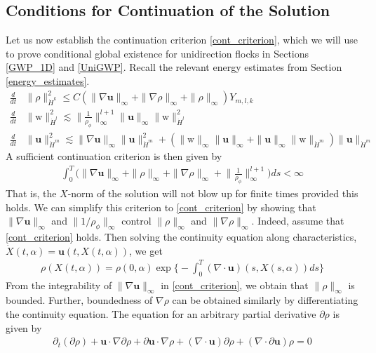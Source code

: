 \documentclass[11pt,letterpaper]{amsart}
\theoremstyle{plain}
\theoremstyle{definition}
\theoremstyle{remark}
\renewcommand{\leq}{\leqslant}
\def\Hmdot{\dot{H}^m}
\def\Hldot{\dot{H}^l}
\def\Hkdot{\dot{H}^k}
\def\u{\textbf{u}}
\def \wt {\mathrm{w}}
\begin{document}
\subsection{Conditions for Continuation of the Solution}
\label{sec_cont_criterion}
Let us now establish the continuation criterion \eqref{cont_criterion}, which we will use to prove
conditional global existence for unidirection flocks in Sections \ref{GWP_1D} and \ref{UniGWP}.  Recall 
the relevant energy estimates from Section \ref{energy_estimates}. 
\begin{align}
    \frac{d}{dt} &\|\rho\|_{\Hkdot}^2 \leq C (\|\nabla \u\|_{\infty} + \|\nabla \rho\|_{\infty} + \|\rho\|_{\infty}) Y_{m,l,k}  \label{rho_energy_estimate} \\
    \frac{d}{dt} &\| \wt \|_{\Hldot}^2 \lesssim \Big\| \frac{1}{\rho_{\phi}} \Big\|_{\infty}^{l+1} \|\u\|_{\infty} \| \wt \|_{\Hldot}^2 \label{w_energy_estimate} \\   
    \frac{d}{dt} &\|\u\|_{\Hmdot}^2 \lesssim \|\nabla \u\|_{\infty} \|\u\|_{\Hmdot}^2 + (\| \wt \|_{\infty} \|\u\|_{\infty} + \|\u\|_{\infty} \| \wt \|_{\Hmdot}) \|\u\|_{\Hmdot} \label{u_energy_estimate}
\end{align}
A sufficient continuation criterion is then given by 
\begin{align*}
    \int_0^{T} \Big(\|\nabla \u\|_{\infty} + \|\rho\|_{\infty} + \|\nabla \rho\|_{\infty} +  \Big\|\frac{1}{\rho_{\phi}} \Big\|_{\infty}^{l+1}  \Big) ds < \infty
\end{align*}
That is, the $X$-norm of the solution will not blow up for finite times provided this holds.  We can simplify this criterion 
to \eqref{cont_criterion} by showing that $\|\nabla \u\|_{\infty}$ and $\| 1/\rho_{\phi} \|_{\infty}$ 
control $\|\rho\|_{\infty}$ and $\|\nabla \rho\|_{\infty}$.  Indeed, assume that \eqref{cont_criterion} holds.
Then solving the continuity equation along characteristics, $\dot{X}(t,\alpha) = \u(t, X(t,\alpha))$, we get 
\begin{align*}
    \rho(X(t, \alpha)) = \rho(0, \alpha) \exp \Big\{ -\int_0^T (\nabla \cdot \u) (s, X(s,\alpha)) ds \Big\}
\end{align*}
From the integrability of $\|\nabla \u\|_{\infty}$ in \eqref{cont_criterion}, we obtain that $\|\rho\|_{\infty}$ is bounded. 
Further, boundedness of $\nabla \rho$ can be obtained similarly by differentiating the continuity equation.  
The equation for an arbitrary partial derivative $\partial \rho$ is given by
\begin{align*}
    \partial_t (\partial \rho) + \u \cdot \nabla \partial \rho + \partial \u \cdot \nabla \rho + (\nabla \cdot \u) \partial \rho + (\nabla \cdot \partial \u) \rho = 0
\end{align*}
\end{document}
